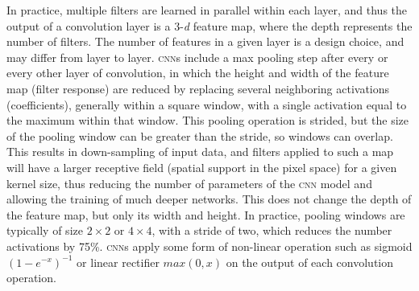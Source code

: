 In practice, multiple filters are learned in parallel within each layer, and thus the output of a convolution layer is a 3-\textit{d} feature map, where the depth represents the number of filters. The number of features in a given layer is a design choice, and may differ from layer to layer.
\textsc{cnn}s include a max pooling \cite{lecun1995convolutional} step after every or every other layer of convolution, in which the height and width of the feature map (filter response) are reduced by replacing several neighboring activations (coefficients), generally within a square window, with a single activation equal to the maximum within that window.  This pooling operation is strided, but the size of the pooling window can be greater than the stride, so windows can overlap.
This results in down-sampling of input data, and filters applied to such a map will have a larger receptive field (spatial support in the pixel space) for a given kernel size, thus reducing the number of parameters of the \textsc{cnn} model and allowing the training of much deeper networks.
This does not change the depth of the feature map, but only its width and height.
In practice, pooling windows are typically of size $2 \times 2$ or $4 \times 4$, with a stride of two, which reduces the number activations by 75\%.
\textsc{cnn}s apply some form of non-linear operation such as sigmoid $ (1-e^{-x})^{-1} $ or linear rectifier $max(0,x)$ on the output of each convolution operation.


